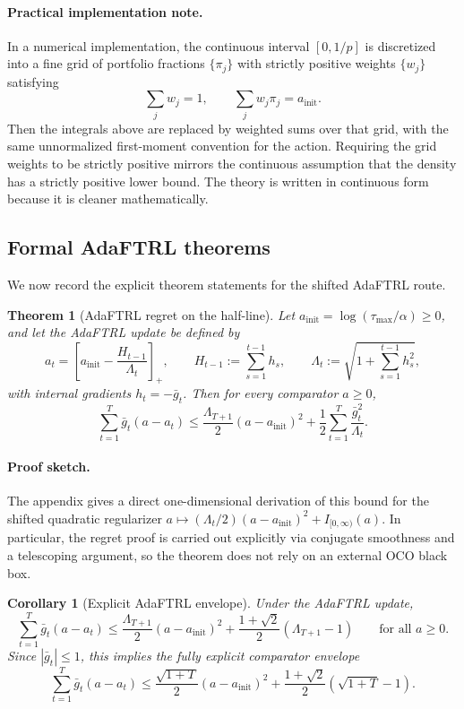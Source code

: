 \documentclass[11pt]{article}
\newtheorem{theorem}{Theorem}
\newtheorem{corollary}{Corollary}
\newcommand{\1}{\mathbf{1}}
\begin{document}
\paragraph{Practical implementation note.}
In a numerical implementation, the continuous interval $[0,1/p]$ is discretized into a fine grid of portfolio fractions \(\{\pi_j\}\) with strictly positive weights \(\{w_j\}\) satisfying
\[
\sum_j w_j=1,
\qquad
\sum_j w_j\pi_j=a_{\mathrm{init}}.
\]
Then the integrals above are replaced by weighted sums over that grid, with the same unnormalized first-moment convention for the action. Requiring the grid weights to be strictly positive mirrors the continuous assumption that the density has a strictly positive lower bound. The theory is written in continuous form because it is cleaner mathematically.


\subsection{Formal AdaFTRL theorems}

We now record the explicit theorem statements for the shifted AdaFTRL route.

\begin{theorem}[AdaFTRL regret on the half-line]
\label{thm:adaftrl-regret-main}
Let \(a_{\mathrm{init}}=\log(\tau_{\max}/\alpha)\ge 0\), and let the AdaFTRL update be defined by
\[
a_t=\left[a_{\mathrm{init}}-\frac{H_{t-1}}{\Lambda_t}\right]_+,
\qquad
H_{t-1}:=\sum_{s=1}^{t-1}h_s,
\qquad
\Lambda_t:=\sqrt{1+\sum_{s=1}^{t-1}h_s^2},
\]
with internal gradients \(h_t=-\bar g_t\). Then for every comparator \(a\ge 0\),
\[
\sum_{t=1}^T \bar g_t(a-a_t)
\le
\frac{\Lambda_{T+1}}{2}(a-a_{\mathrm{init}})^2+\frac12\sum_{t=1}^T\frac{\bar g_t^2}{\Lambda_t}.
\]
\end{theorem}

\paragraph{Proof sketch.}
The appendix gives a direct one-dimensional derivation of this bound for the shifted quadratic regularizer \(a\mapsto (\Lambda_t/2)(a-a_{\mathrm{init}})^2+I_{[0,\infty)}(a)\). In particular, the regret proof is carried out explicitly via conjugate smoothness and a telescoping argument, so the theorem does not rely on an external OCO black box.

\begin{corollary}[Explicit AdaFTRL envelope]
\label{cor:adaftrl-envelope-main}
Under the AdaFTRL update,
\[
\sum_{t=1}^T \bar g_t(a-a_t)
\le
\frac{\Lambda_{T+1}}{2}(a-a_{\mathrm{init}})^2+
\frac{1+\sqrt{2}}{2}(\Lambda_{T+1}-1)
\qquad\text{for all }a\ge 0.
\]
Since \( |\bar g_t|\le 1 \), this implies the fully explicit comparator envelope
\[
\sum_{t=1}^T \bar g_t(a-a_t)
\le
\frac{\sqrt{1+T}}{2}(a-a_{\mathrm{init}})^2+
\frac{1+\sqrt{2}}{2}(\sqrt{1+T}-1).
\]
\end{corollary}
\end{document}
